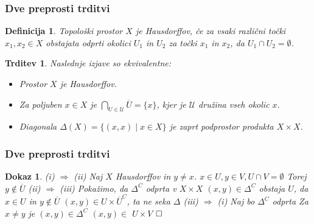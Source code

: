 \documentclass{beamer}
\def\qed{$\hfill\Box$}   %
\newtheorem{trditev}{Trditev}
\newtheorem{definicija}{Definicija}
\newtheorem{dokaz}{Dokaz}
\begin{document}
\begin{frame}
\frametitle{Dve preprosti trditvi}

\begin{definicija}
    Topološki prostor $X$ je \emph{Hausdorffov}, če za vsaki različni točki $x_1, x_2 \in X$ obstajata odprti okolici $U_1$ in $U_2$ za točki $x_1$ in $x_2$, da $U_1 \cap U_2 = \emptyset$.
\end{definicija}
\pause

\begin{trditev}
    Naslednje izjave so ekvivalentne:
    \pause
    \begin{itemize}
        \item[\rm (i)] Prostor $X$ je Hausdorffov.
        \pause 
        \item[\rm (ii)] Za poljuben $x \in X$ je $\bigcap_{U \in \mathcal{U}} \overline{U} = \{x\}$, kjer je $\mathcal{U}$ družina vseh okolic $x$.
        \pause 
        \item[\rm (iii)] Diagonala $\Delta(X) = \{(x,x) \mid x \in X \} $ je zaprt podprostor produkta $X \times X$.
    \end{itemize}
\end{trditev}

\end{frame}

\begin{frame}
\frametitle{Dve preprosti trditvi}

\begin{dokaz}
    (i) $\Rightarrow$ (ii) Naj $X$ Hausdorffov in $y \neq x$.
    \newline
    \pause
    $x \in U, y \in V, U \cap V = \emptyset$
    \newline
    \pause
    Torej $y \notin \overline{U}$
    \bigskip
    \newline
    \pause
    (ii) $\Rightarrow$ (iii) Pokažimo, da $\Delta^C$ odprta v $X \times X$
    \newline
    \pause
    $(x,y) \in \Delta^C$ obstaja $U$, da $x \in U$ in $y \notin \overline{U}$
    \newline
    \pause
    $(x,y) \in U \times \overline{U}^C$, ta ne seka $\Delta$
    \bigskip
    \newline
    \pause
    (iii) $\Rightarrow$ (i) Naj bo $\Delta^C$ odprta
    \newline
    \pause
    Za $x \neq y$ je $(x,y) \in \Delta^C$
    \newline
    \pause
    $(x,y) \in $ $U \times V$
    \pause
    \qed
\end{dokaz}

\end{frame}
\end{document}
